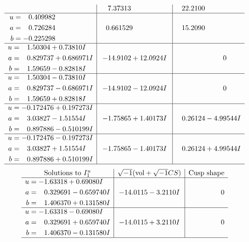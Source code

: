 \documentclass[1p]{elsarticle_modified}
\theoremstyle{definition}
\newcommand{\I}{\sqrt{-1}}
\begin{document}
$$\begin{array}{c|c|c}
 & \phantom{-}7.37313\phantom{ +0.000000I} & \phantom{-}22.2100\phantom{ +0.000000I} \\ \hline\begin{aligned}
u &= \phantom{-}0.409982\phantom{ +0.000000I} \\
a &= \phantom{-}0.726284\phantom{ +0.000000I} \\
b &= -0.225298\phantom{ +0.000000I}\end{aligned}
 & \phantom{-}0.661529\phantom{ +0.000000I} & \phantom{-}15.2090\phantom{ +0.000000I} \\ \hline\begin{aligned}
u &= \phantom{-}1.50304 + 0.73810 I \\
a &= \phantom{-}0.829737 + 0.686971 I \\
b &= \phantom{-}1.59659 - 0.82818 I\end{aligned}
 & -14.9102 + 12.0924 I & \phantom{-0.000000 } 0 \\ \hline\begin{aligned}
u &= \phantom{-}1.50304 - 0.73810 I \\
a &= \phantom{-}0.829737 - 0.686971 I \\
b &= \phantom{-}1.59659 + 0.82818 I\end{aligned}
 & -14.9102 - 12.0924 I & \phantom{-0.000000 } 0 \\ \hline\begin{aligned}
u &= -0.172476 + 0.197273 I \\
a &= \phantom{-}3.03827 - 1.51554 I \\
b &= \phantom{-}0.897886 - 0.510199 I\end{aligned}
 & -1.75865 + 1.40173 I & \phantom{-}0.26124 - 4.99544 I \\ \hline\begin{aligned}
u &= -0.172476 - 0.197273 I \\
a &= \phantom{-}3.03827 + 1.51554 I \\
b &= \phantom{-}0.897886 + 0.510199 I\end{aligned}
 & -1.75865 - 1.40173 I & \phantom{-}0.26124 + 4.99544 I\\
 \hline 
 \end{array}$$\newpage$$\begin{array}{c|c|c}  
\text{Solutions to }I^u_{1}& \I (\text{vol} + \sqrt{-1}CS) & \text{Cusp shape}\\
 \hline 
\begin{aligned}
u &= -1.63318 + 0.69080 I \\
a &= \phantom{-}0.329691 - 0.659740 I \\
b &= \phantom{-}1.406370 + 0.131580 I\end{aligned}
 & -14.0115 - 3.2110 I & \phantom{-0.000000 } 0 \\ \hline\begin{aligned}
u &= -1.63318 - 0.69080 I \\
a &= \phantom{-}0.329691 + 0.659740 I \\
b &= \phantom{-}1.406370 - 0.131580 I\end{aligned}
 & -14.0115 + 3.2110 I & \phantom{-0.000000 } 0\\
 \hline 
 \end{array}$$\newpage\newpage\renewcommand{\arraystretch}{1}
\end{document}
